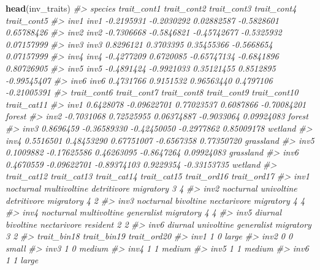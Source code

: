 \documentclass[
]{article}
\newenvironment{Shaded}{\begin{snugshade}}{\end{snugshade}}
\newcommand{\CommentTok}[1]{\textcolor[rgb]{0.56,0.35,0.01}{\textit{#1}}}
\newcommand{\FunctionTok}[1]{\textcolor[rgb]{0.13,0.29,0.53}{\textbf{#1}}}
\newcommand{\NormalTok}[1]{#1}
\begin{document}
\begin{Shaded}
\begin{Highlighting}[]
\FunctionTok{head}\NormalTok{(inv\_traits)}
\CommentTok{\#\textgreater{}      species trait\_cont1 trait\_cont2 trait\_cont3 trait\_cont4 trait\_cont5}
\CommentTok{\#\textgreater{} inv1    inv1  {-}0.2195931  {-}0.2030292  0.02882587  {-}0.5828601  0.65788426}
\CommentTok{\#\textgreater{} inv2    inv2  {-}0.7306668  {-}0.5846821 {-}0.45742677  {-}0.5325932  0.07157999}
\CommentTok{\#\textgreater{} inv3    inv3   0.8296121   0.3703395  0.35455366  {-}0.5668654  0.07157999}
\CommentTok{\#\textgreater{} inv4    inv4  {-}0.4277209   0.6720085 {-}0.65747134  {-}0.6841896  0.80726905}
\CommentTok{\#\textgreater{} inv5    inv5  {-}0.4891424  {-}0.9921033  0.35121455   0.8512895 {-}0.99545407}
\CommentTok{\#\textgreater{} inv6    inv6   0.4731766   0.9151532  0.96563440   0.4797106 {-}0.21005391}
\CommentTok{\#\textgreater{}      trait\_cont6 trait\_cont7 trait\_cont8 trait\_cont9 trait\_cont10 trait\_cat11}
\CommentTok{\#\textgreater{} inv1   0.6428078 {-}0.09622701  0.77023537   0.6087866  {-}0.70084201      forest}
\CommentTok{\#\textgreater{} inv2  {-}0.7031068  0.72525955  0.06374887  {-}0.9033064   0.09924083      forest}
\CommentTok{\#\textgreater{} inv3   0.8696459 {-}0.36589330 {-}0.42450050  {-}0.2977862   0.85009178     wetland}
\CommentTok{\#\textgreater{} inv4   0.5516501  0.48453290  0.67751007  {-}0.6567358   0.77350720   grassland}
\CommentTok{\#\textgreater{} inv5   0.1009882 {-}0.17625586  0.46263095  {-}0.8647264   0.09924083   grassland}
\CommentTok{\#\textgreater{} inv6   0.4670559 {-}0.09622701 {-}0.89374103   0.9229354  {-}0.33153735     wetland}
\CommentTok{\#\textgreater{}      trait\_cat12  trait\_cat13 trait\_cat14 trait\_cat15 trait\_ord16 trait\_ord17}
\CommentTok{\#\textgreater{} inv1   nocturnal multivoltine detritivore   migratory           3           4}
\CommentTok{\#\textgreater{} inv2   nocturnal   univoltine detritivore   migratory           4           2}
\CommentTok{\#\textgreater{} inv3   nocturnal    bivoltine nectarivore   migratory           4           4}
\CommentTok{\#\textgreater{} inv4   nocturnal multivoltine  generalist   migratory           4           4}
\CommentTok{\#\textgreater{} inv5     diurnal    bivoltine nectarivore    resident           2           2}
\CommentTok{\#\textgreater{} inv6     diurnal   univoltine  generalist   migratory           3           2}
\CommentTok{\#\textgreater{}      trait\_bin18 trait\_bin19 trait\_ord20}
\CommentTok{\#\textgreater{} inv1           1           0       large}
\CommentTok{\#\textgreater{} inv2           0           0       small}
\CommentTok{\#\textgreater{} inv3           1           0      medium}
\CommentTok{\#\textgreater{} inv4           1           1      medium}
\CommentTok{\#\textgreater{} inv5           1           1      medium}
\CommentTok{\#\textgreater{} inv6           1           1       large}
\end{Highlighting}
\end{Shaded}
\end{document}
